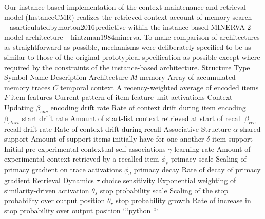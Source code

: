 \markdownRendererInterblockSeparator
{}Our instance-based implementation of the context maintenance and retrieval model (InstanceCMR) realizes the retrieved context account of memory search +{as\markdownRendererNbsp{}articulated\markdownRendererNbsp{}by}{}{morton2016predictive} within the instance-based MINERVA 2 model architecture +{}{}{hintzman1984minerva}. To make comparison of architectures as straightforward as possible, mechanisms were deliberately specified to be as similar to those of the original prototypical specification as possible except where required by the constraints of the instance-based architecture.\markdownRendererInterblockSeparator
{}%
{{Structure Type}%
{Symbol}%
{Name}%
{Description}%
}%
{{Architecture}%
{}%
{}%
{}%
}%
{{}%
{$M$}%
{memory}%
{Array of accumulated memory traces}%
}%
{{}%
{$C$}%
{temporal context}%
{A recency-weighted average of encoded items}%
}%
{{}%
{$F$}%
{item features}%
{Current pattern of item feature unit activations}%
}%
{{Context Updating}%
{}%
{}%
{}%
}%
{{}%
{${\beta}_{enc}$}%
{encoding drift rate}%
{Rate of context drift during item encoding}%
}%
{{}%
{${\beta}_{start}$}%
{start drift rate}%
{Amount of start-list context retrieved at start of recall}%
}%
{{}%
{${\beta}_{rec}$}%
{recall drift rate}%
{Rate of context drift during recall}%
}%
{{Associative Structure}%
{}%
{}%
{}%
}%
{{}%
{${\alpha}$}%
{shared support}%
{Amount of support items initially have for one another}%
}%
{{}%
{${\delta}$}%
{item support}%
{Initial pre-experimental contextual self-associations}%
}%
{{}%
{${\gamma}$}%
{learning rate}%
{Amount of experimental context retrieved by a recalled item}%
}%
{{}%
{${\phi}_{s}$}%
{primacy scale}%
{Scaling of primacy gradient on trace activations}%
}%
{{}%
{${\phi}_{d}$}%
{primacy decay}%
{Rate of decay of primacy gradient}%
}%
{{Retrieval Dynamics}%
{}%
{}%
{}%
}%
{{}%
{${\tau}$}%
{choice sensitivity}%
{Exponential weighting of similarity-driven activation}%
}%
{{}%
{${\theta}_{s}$}%
{stop probability scale}%
{Scaling of the stop probability over output position}%
}%
{{}%
{${\theta}_{r}$}%
{stop probability growth}%
{Rate of increase in stop probability over output position}%
}%
\markdownRendererInterblockSeparator
{}\markdownRendererInterblockSeparator
{}```python\markdownRendererInterblockSeparator
{}```\relax